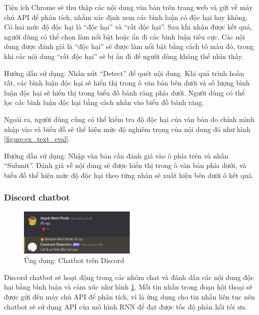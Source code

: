 

Tiện ích Chrome sẽ thu thập các nội dung văn bản trên trang web và gửi về máy chủ API để phân tích, nhằm xác định xem các bình luận có độc hại hay không. Có hai mức độ độc hại là ``độc hại'' và ``rất độc hại''. Sau khi nhận được kết quả, người dùng có thể chọn làm nổi bật hoặc ẩn đi các bình luận tiêu cực. Các nội dung được đánh giá là ``độc hại'' sẽ được làm nổi bật bằng cách tô màu đỏ, trong khi các nội dung ``rất độc hại'' sẽ bị ẩn đi để người dùng không thể nhìn thấy.

Hướng dẫn sử dụng: Nhấn nút ``Detect'' để quét nội dung. Khi quá trình hoàn tất, các bình luận độc hại sẽ hiển thị trong ô văn bản bên dưới và số lượng bình luận độc hại sẽ hiển thị trong biểu đồ bánh răng phía dưới. Người dùng có thể lọc các bình luận độc hại bằng cách nhấn vào biểu đồ bánh răng.

Ngoài ra, người dùng cũng có thể kiểm tra độ độc hại của văn bản do chính mình nhập vào và biểu đồ sẽ thể hiện mức độ nghiêm trọng của nội dung đó như hình \ref{figure:ex_text_eval}.

Hướng dẫn sử dụng: Nhập văn bản cần đánh giá vào ô phía trên và nhấn ``Submit''. Đánh giá về nội dung sẽ được hiển thị trong ô văn bản phía dưới, và biểu đồ thể hiện mức độ độc hại theo từng nhãn sẽ xuất hiện bên dưới ô kết quả.

\subsubsection{Discord chatbot}
\begin{figure}[htb]
    \centering
    \includegraphics[width=0.5\textwidth]{image/bot_discord.png}
    \caption{Ứng dụng: Chatbot trên Discord}
    \label{figure:bot_discord}
\end{figure}

Discord chatbot sẽ hoạt động trong các nhóm chat và đánh dấu các nội dung độc hại bằng bình luận và cảm xúc như hình \ref{figure:bot_discord}. Mỗi tin nhắn trong đoạn hội thoại sẽ được gửi đến máy chủ API để phân tích, vì là ứng dụng cho tin nhắn liên tục nên chatbot sẽ sử dụng API của mô hình RNN để đạt được tốc độ phản hồi tối ưu. 

